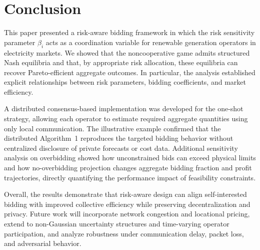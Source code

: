 \documentclass[conference]{IEEEtran}
\begin{document}
\section{Conclusion}

This paper presented a risk-aware bidding framework in which the risk sensitivity parameter $\beta_i$ acts as a coordination variable for renewable generation operators in electricity markets. We showed that the noncooperative game admits structured Nash equilibria and that, by appropriate risk allocation, these equilibria can recover Pareto-efficient aggregate outcomes. In particular, the analysis established explicit relationships between risk parameters, bidding coefficients, and market efficiency.

A distributed consensus-based implementation was developed for the one-shot strategy, allowing each operator to estimate required aggregate quantities using only local communication. The illustrative example confirmed that the distributed Algorithm~1 reproduces the targeted bidding behavior without centralized disclosure of private forecasts or cost data. Additional sensitivity analysis on overbidding showed how unconstrained bids can exceed physical limits and how no-overbidding projection changes aggregate bidding fraction and profit trajectories, directly quantifying the performance impact of feasibility constraints.

Overall, the results demonstrate that risk-aware design can align self-interested bidding with improved collective efficiency while preserving decentralization and privacy. Future work will incorporate network congestion and locational pricing, extend to 
non-Gaussian uncertainty structures and time-varying operator participation, and analyze robustness under communication delay, packet loss, and adversarial behavior.



\end{document}
